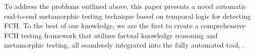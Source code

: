 









To address the problems outlined above, this paper presents a novel automatic end-to-end metamorphic testing technique based on temporal logic for detecting FCH. To the best of our knowledge, we are the first to create a comprehensive FCH testing framework that utilizes factual knowledge reasoning and metamorphic testing, all seamlessly integrated into the fully automated tool, \tool. 

